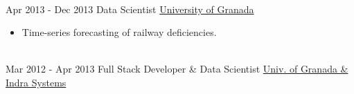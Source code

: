 \documentclass[letterpaper]{twentysecondcv} %
\begin{document}
\begin{twenty}
\\
        
	  \twentyitem
    	{Apr 2013 -}
		{Dec 2013}
        {Data Scientist}
        {\href{https://www.ugr.es/}{University of Granada}}
        {}
        {\begin{itemize}
        	\item Time-series forecasting of railway deficiencies. %
        \end{itemize}}
        
\\
	  \twentyitem
    	{Mar 2012 -}
		{Apr 2013}
        {Full Stack Developer \& Data Scientist}
        {\href{https://www.indracompany.com/en/}{Univ. of Granada \& Indra Systems}}
        {%
        }
        {}
        \\
\end{twenty}
\end{document}
